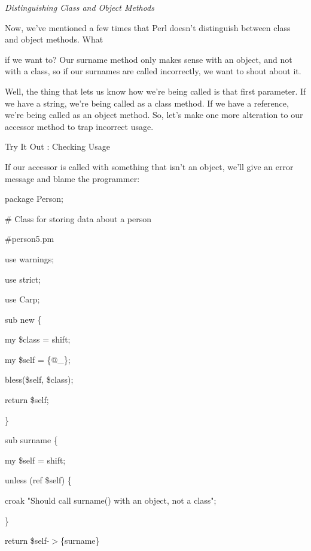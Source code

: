 \documentclass[a4paper,11pt]{book}
\begin{document}
\noindent 

\noindent \textit{Distinguishing Class and Object Methods}

\noindent Now, we've mentioned a few times that Perl doesn't distinguish between class and object methods. What

\noindent if we want to? Our surname method only makes sense with an object, and not with a class, so if our surnames are called incorrectly, we want to shout about it.

\noindent 

\noindent Well, the thing that lets us know how we're being called is that first parameter. If we have a string, we're being called as a class method. If we have a reference, we're being called as an object method. So, let's make one more alteration to our accessor method to trap incorrect usage.

\noindent 

\noindent Try It Out : Checking Usage

\noindent If our accessor is called with something that isn't an object, we'll give an error message and blame the programmer:

\noindent 

\noindent package Person;

\noindent \# Class for storing data about a person

\noindent \#person5.pm

\noindent use warnings;

\noindent use strict;

\noindent use Carp;

\noindent 

\noindent sub new \{

\noindent my \$class = shift;

\noindent my \$self = \{@\_\};

\noindent bless(\$self, \$class);

\noindent return \$self;

\noindent \}

\noindent 

\noindent 

\noindent sub surname \{

\noindent my \$self = shift;

\noindent unless (ref \$self) \{

\noindent croak "Should call surname() with an object, not a class";

\noindent \}

\noindent return \$self-$>$\{surname\}
\end{document}
